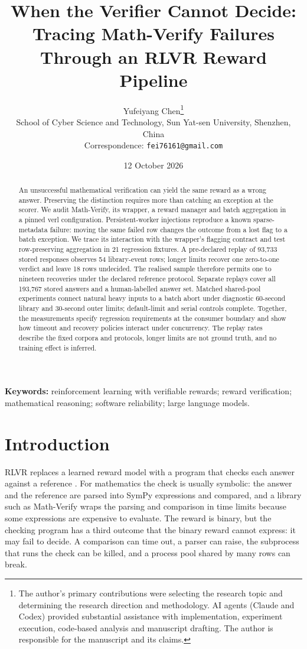 \documentclass[10pt,a4paper]{article}
\title{When the Verifier Cannot Decide: Tracing {Math-Verify} Failures\\
Through an {RLVR} Reward Pipeline }
\author{Yufeiyang Chen\thanks{The author's primary contributions were
selecting the research topic and determining the research direction and
methodology. AI agents (Claude and Codex) provided substantial assistance
with implementation, experiment execution, code-based analysis and
manuscript drafting. The author is responsible for the manuscript and its
claims.}\\[2pt]
School of Cyber Science and Technology, Sun Yat-sen University, Shenzhen, China\\
Correspondence: \texttt{fei76161@gmail.com}}
\date{12 October 2026}
\let\cite\citep
\newcommand{\mv}{Math-Verify}
\begin{document}
\maketitle

\begin{abstract}
An unsuccessful mathematical verification can yield the same reward as
a wrong answer. Preserving the distinction requires more than catching
an exception at the scorer. We audit Math-Verify, its wrapper, a reward
manager and batch aggregation in a pinned verl configuration.
Persistent-worker injections reproduce a known sparse-metadata failure:
moving the same failed row changes the outcome from a lost flag to a
batch exception. We trace its interaction with the wrapper's flagging
contract and test row-preserving aggregation in 21 regression fixtures.
A pre-declared replay of 93,733 stored responses observes 54 library-event
rows; longer limits recover one zero-to-one verdict and leave 18 rows
undecided. The realised sample therefore permits one to nineteen
recoveries under the declared reference protocol. Separate replays
cover all 193,767 stored answers and a human-labelled answer set.
Matched shared-pool experiments connect natural heavy inputs to a batch
abort under diagnostic 60-second library and 30-second outer limits;
default-limit and serial controls complete. Together, the measurements
specify regression requirements at the consumer boundary and show how
timeout and recovery policies interact under concurrency. The replay
rates describe the fixed corpora and protocols, longer limits are not
ground truth, and no training effect is inferred.
\end{abstract}

\noindent\textbf{Keywords:} reinforcement learning with verifiable rewards;
reward verification; mathematical reasoning; software reliability; large language models.

\section{Introduction}

RLVR replaces a learned reward model with a program that checks each answer
against a reference \cite{lambert2024tulu3,shao2024deepseekmath,deepseek2025r1}.
For mathematics the check is usually symbolic: the answer and the reference
are parsed into SymPy expressions and compared, and a library such as
\mv{} \cite{mathverify} wraps the parsing and comparison in time limits
because some expressions are expensive to evaluate. The reward is binary,
but the checking program has a third outcome that the binary reward cannot
express: it may fail to decide. A comparison can time out, a parser can
raise, the subprocess that runs the check can be killed, and a process
pool shared by many rows can break.
\end{document}
